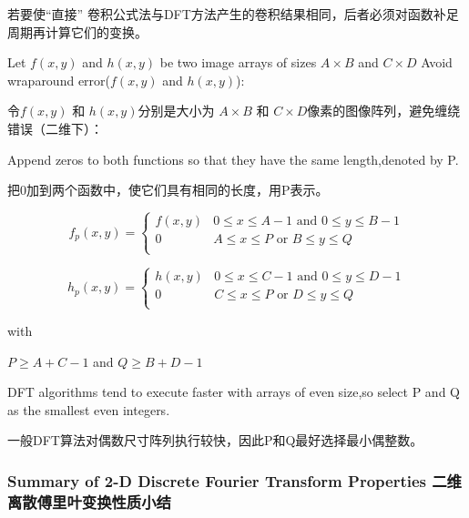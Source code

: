\documentclass[12pt]{article}
\numberwithin{equation}{section}%
\begin{document}
若要使``直接'' 卷积公式法与DFT方法产生的卷积结果相同，后者必须对函数补足周期再计算它们的变换。

Let $f(x,y)$ and $h(x,y)$ be two image arrays of sizes $A\times B$ and $C\times D$ Avoid wraparound error($f(x,y)$ and $h(x,y)$):

令$f(x,y)$ 和 $h(x,y)$分别是大小为 $A\times B$ 和 $C\times D$像素的图像阵列，避免缠绕错误（二维下）：

Append zeros to both functions so that they have the same length,denoted by P.

把0加到两个函数中，使它们具有相同的长度，用P表示。

\begin{equation} \label{4.43}
f_{p}(x,y) = \left\{ \begin{array}{ll}
f(x,y) & \textrm{$0\leq x\leq A-1$ and $0\leq y\leq B-1$}\\
0 & \textrm{$A\leq x\leq P$ or $B\leq y\leq Q$ }\\
\end{array} \right.
\end{equation}

\begin{equation} \label{4.44}
h_{p}(x,y) = \left\{ \begin{array}{ll}
h(x,y) & \textrm{$0\leq x\leq C-1$ and $0\leq y\leq D-1$}\\
0 & \textrm{$C\leq x\leq P$ or $D\leq y\leq Q$ }\\
\end{array} \right.
\end{equation}

with 

$P\geq A+C-1$ and $Q\geq B+D-1$

DFT algorithms tend to execute faster with arrays of even size,so select P and Q as the smallest even integers.

一般DFT算法对偶数尺寸阵列执行较快，因此P和Q最好选择最小偶整数。

\subsubsection{Summary of 2-D Discrete Fourier Transform Properties 二维离散傅里叶变换性质小结}

\newpage
\end{document}
